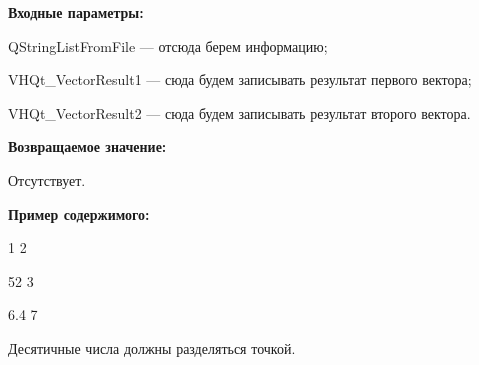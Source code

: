 \textbf{Входные параметры:}
 
QStringListFromFile --- отсюда берем информацию;
 
    VHQt\_VectorResult1 --- сюда будем записывать результат первого вектора;
 
    VHQt\_VectorResult2 --- сюда будем записывать результат второго вектора.

\textbf{Возвращаемое значение:}

Отсутствует.

\textbf{Пример содержимого:}

1	2

52	3

6.4	7

Десятичные числа должны разделяться точкой.